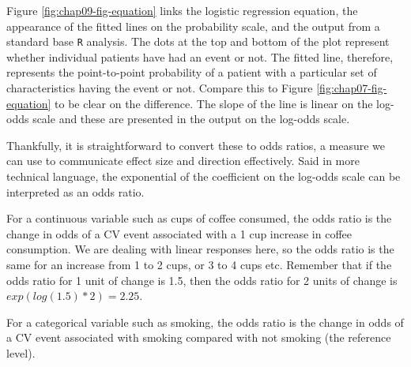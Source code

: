 \documentclass[
  12pt,
  krantz2]{krantz}
\begin{document}
Figure \ref{fig:chap09-fig-equation} links the logistic regression equation, the appearance of the fitted lines on the probability scale, and the output from a standard base \texttt{R} analysis.
The dots at the top and bottom of the plot represent whether individual patients have had an event or not. The fitted line, therefore, represents the point-to-point probability of a patient with a particular set of characteristics having the event or not.
Compare this to Figure \ref{fig:chap07-fig-equation} to be clear on the difference.
The slope of the line is linear on the log-odds scale and these are presented in the output on the log-odds scale.

Thankfully, it is straightforward to convert these to odds ratios, a measure we can use to communicate effect size and direction effectively.
Said in more technical language, the exponential of the coefficient on the log-odds scale can be interpreted as an odds ratio.

For a continuous variable such as cups of coffee consumed, the odds ratio is the change in odds of a CV event associated with a 1 cup increase in coffee consumption.
We are dealing with linear responses here, so the odds ratio is the same for an increase from 1 to 2 cups, or 3 to 4 cups etc.
Remember that if the odds ratio for 1 unit of change is 1.5, then the odds ratio for 2 units of change is \(exp(log(1.5)*2) = 2.25\).

For a categorical variable such as smoking, the odds ratio is the change in odds of a CV event associated with smoking compared with not smoking (the reference level).
\end{document}
